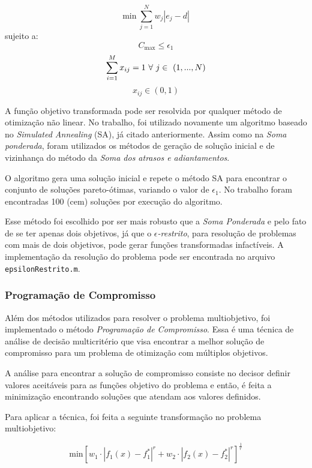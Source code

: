 \documentclass[conference]{IEEEtran}
\begin{document}
\[\mathrm{min}\ \sum_{j=1}^{N}w_j|e_j-d| \]
sujeito a:
\begin{equation}
C_{\mathrm{max}} \le \epsilon_1
\end{equation}
\begin{equation}
\sum_{i=1}^{M}x_{ij}=1\ \forall\ j \in\ (1,...,N)\\
\label{eq:rest6}
\end{equation}
\[x_{ij} \in (0, 1)\]

A função objetivo transformada pode ser resolvida por qualquer método de otimização não linear. No trabalho, foi utilizado novamente um algoritmo baseado no \emph{Simulated Annealing} (SA), já citado anteriormente. Assim como na \emph{Soma ponderada}, foram utilizados os métodos de geração de solução inicial e de vizinhança do método da \emph{Soma dos atrasos e adiantamentos}.

O algoritmo gera uma solução inicial e repete o método SA para encontrar o conjunto de soluções pareto-ótimas, variando o valor de $\epsilon_1$. No trabalho foram encontradas 100 (cem) soluções por execução do algoritmo.

Esse método foi escolhido por ser mais robusto que a \emph{Soma Ponderada} e pelo fato de se ter apenas dois objetivos, já que o \emph{$\epsilon$-restrito}, para resolução de problemas com mais de dois objetivos, pode gerar funções transformadas infactíveis. A implementação da resolução do problema pode ser encontrada no arquivo \texttt{epsilonRestrito.m}.

\subsubsection{Programação de Compromisso}
Além dos métodos utilizados para resolver o problema multiobjetivo, foi implementado o método \emph{Programação de Compromisso}. Essa é uma técnica de análise de decisão multicritério que visa encontrar a melhor solução de compromisso para um problema de otimização com múltiplos objetivos.

A análise para encontrar a solução de compromisso consiste no decisor definir valores aceitáveis para as funções objetivo do problema e então, é feita a minimização encontrando soluções que atendam aos valores definidos.

Para aplicar a técnica, foi feita a seguinte transformação no problema multiobjetivo:

\[ \mathrm{min} {\left[ w_1 \cdot {| f_1(x) - f_1^{*} |}^{r} + w_2 \cdot {| f_2(x) - f_2^{*} |}^{r} \right]}^{\frac{1}{r}} \]
\end{document}
